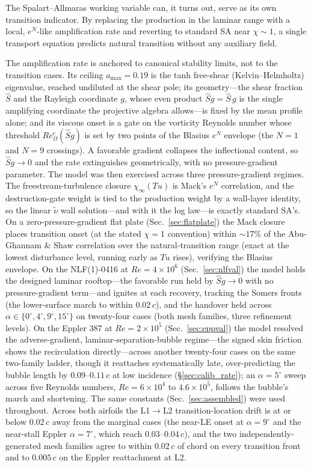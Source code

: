 \documentclass[journal]{new-aiaa}
\begin{document}
The Spalart--Allmaras working variable can, it turns out, serve as its
own transition indicator. By replacing the production in the laminar range with a local,
$e^N$-like amplification rate and reverting to standard SA near
$\chi\!\sim\!1$, a single transport equation predicts natural transition
without any auxiliary field.

The amplification rate is anchored to canonical stability limits, not to the
transition cases. Its ceiling $a_{\max}\!=\!0.19$ is the tanh free-shear
(Kelvin--Helmholtz) eigenvalue, reached undiluted at the shear pole; its
geometry---the shear fraction $\hat S$ and the Rayleigh coordinate $g$, whose
even product $\hat S g\!=\!\hat S\,g$ is the single amplifying coordinate the projective
algebra allows---is fixed by the mean profile alone; and its viscous onset is a
gate on the vorticity Reynolds number whose threshold $Re_\Omega^{\mathrm c}(\hat S g)$
is set by two points of the Blasius $e^N$ envelope (the $N\!=\!1$ and $N\!=\!9$
crossings). A favorable gradient collapses the inflectional content, so
$\hat S g\!\to\!0$ and the rate extinguishes geometrically, with no pressure-gradient
parameter. The model was then exercised across three pressure-gradient regimes. The freestream-turbulence
closure $\chi_\infty(Tu)$ is Mack's $e^N$ correlation, and the destruction-gate
weight is tied to the production weight by a wall-layer identity, so the
linear $\tilde\nu$ wall solution---and with it the log law---is exactly
standard SA's. On a zero-pressure-gradient flat plate (Sec.~\ref{sec:flatplate}) the Mack
closure places transition onset (at the stated $\chi\!=\!1$ convention)
within $\sim\!17\%$ of the Abu-Ghannam \& Shaw
correlation over the natural-transition range (exact at the lowest disturbance
level, running early as $Tu$ rises), verifying the Blasius envelope. On
the NLF(1)-0416 at $Re\!=\!4\!\times\!10^6$ (Sec.~\ref{sec:nlfval}) the
model holds the designed laminar rooftop---the favorable run held by
$\hat S g\!\to\!0$ with no pressure-gradient term---and ignites at each recovery,
tracking the Somers fronts (the lower-surface march to within $0.02\,c$), and the
handover held across $\alpha\!\in\!\{0^\circ,4^\circ,9^\circ,15^\circ\}$ on
twenty-four cases (both mesh families, three refinement levels). On the Eppler
387 at
$Re\!=\!2\!\times\!10^5$ (Sec.~\ref{sec:eppval}) the
model resolved the adverse-gradient, laminar-separation-bubble regime---the signed
skin friction shows the recirculation directly---across another twenty-four cases
on the same two-family ladder, though it reattaches systematically late,
over-predicting the bubble length by $0.09$--$0.11\,c$ at low incidence
(\S\ref{sec:calib_rate}); an $\alpha\!=\!5^\circ$ sweep across five Reynolds numbers,
$Re\!=\!6\!\times\!10^4$ to $4.6\!\times\!10^5$, follows the bubble's march and
shortening. The same constants (Sec.~\ref{sec:assembled}) were used
throughout. Across both airfoils the L1$\to$L2 transition-location drift is at
or below $0.02\,c$ away from the marginal cases (the near-LE onset at
$\alpha\!=\!9^\circ$ and the near-stall Eppler $\alpha\!=\!7^\circ$, which
reach $0.03$--$0.04\,c$), and the two independently-generated mesh families
agree to within $0.02\,c$ of chord on every transition front and to
$0.005\,c$ on the Eppler reattachment at L2.
\end{document}

